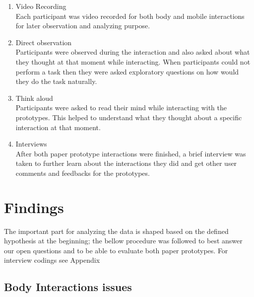 \begin{enumerate}
\item Video Recording \\
Each participant was video recorded for both body and mobile interactions for later observation and analyzing purpose. 

\item Direct observation \\
Participants were observed during the interaction and also asked about what they thought at that moment while interacting. When participants could not perform a task then they were asked exploratory questions on how would they do the task naturally.

\item Think aloud \\
Participants were asked to read their mind while interacting with the prototypes. This helped to understand what they thought about a specific interaction at that moment. 

\item Interviews \\
After both paper prototype interactions were finished, a brief interview was taken to further learn about the interactions they did and get other user comments and feedbacks for the prototypes.
\end{enumerate}



\section{Findings}
The important part for analyzing the data is shaped based on the defined hypothesis at the beginning; the bellow procedure was followed to best answer our open questions and to be able to evaluate both paper prototypes. For interview codings 
see Appendix %

\subsection{Body Interactions issues}

